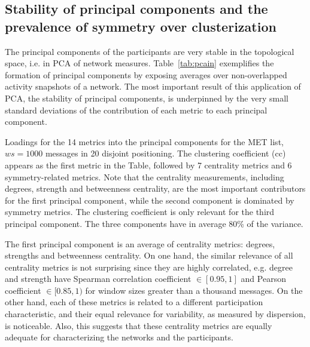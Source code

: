 \documentclass[%
	aip,
	jmp,%
	amsmath,amssymb,
	reprint,%
]{revtex4-1}
\begin{document}
\subsection{Stability of principal components and the prevalence of symmetry over clusterization}\label{prevalence}

The principal components of the participants are very stable in the topological space,
i.e. in PCA of network measures.
Table~\ref{tab:pcain} exemplifies the formation of principal components
by exposing averages over non-overlapped activity snapshots of a network.
The most important result of this application of PCA,
the stability of principal components,
is underpinned by the very small standard deviations
of the contribution of
each metric to each principal component.

\begin{table}[!h]
	\caption{Loadings for the 14 metrics into the principal components for the MET list, $ws=1000$ messages in 20 disjoint positioning. The clustering coefficient (cc) appears as the first metric in the Table, followed by 7 centrality metrics and 6 symmetry-related metrics. Note that the centrality measurements, including degrees, strength and betweenness centrality, are the most important contributors for the first principal component, while the second component is dominated by symmetry metrics. The clustering coefficient is only relevant for the third principal component. The three components have in average 80\% of the variance.}
		\footnotesize
		
		\label{tab:pcain}
	\end{table}

The first principal component is an average of centrality metrics:
degrees, strengths and betweenness centrality.
On one hand, the similar relevance of all centrality metrics is not surprising since they are highly correlated,
e.g. degree and strength have Spearman correlation coefficient $\in [0.95,1]$ 
and Pearson coefficient $\in [0.85,1)$ for window sizes greater than a thousand messages.
On the other hand, each of these metrics is related to a different participation characteristic,
and their equal relevance for variability,
as measured by dispersion, is noticeable.
Also, this suggests that these centrality metrics 
are equally adequate for characterizing the networks
and the participants.
\end{document}
